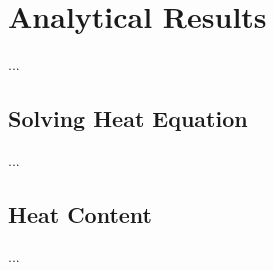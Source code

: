 \section{Analytical Results}

...


\subsection{Solving Heat Equation}


...


\subsection{Heat Content}


...





